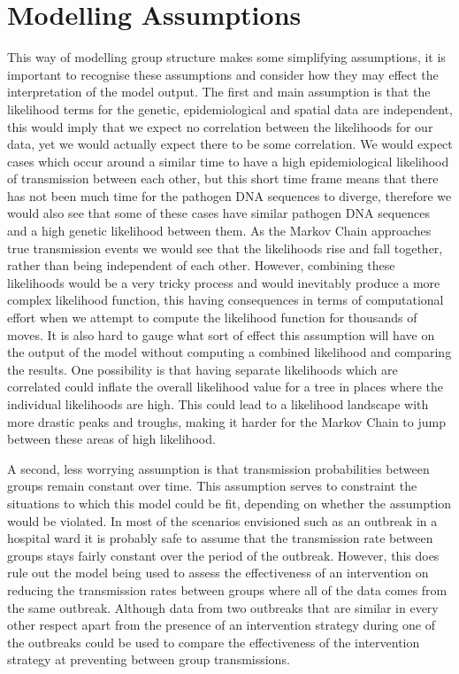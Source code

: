 \documentclass[11pt,a4paper]{report}
\begin{document}
\section{Modelling Assumptions}
This way of modelling group structure makes some simplifying assumptions, it is important to recognise these assumptions and consider how they may effect the interpretation of the model output. The first and main assumption is that the likelihood terms for the genetic, epidemiological and spatial data are independent, this would imply that we expect no correlation between the likelihoods for our data, yet we would actually expect there to be some correlation. We would expect cases which occur around a similar time to have a high epidemiological likelihood of transmission between each other, but this short time frame means that there has not been much time for the pathogen DNA sequences to diverge, therefore we would also see that some of these cases have similar pathogen DNA sequences and a high genetic likelihood between them. As the Markov Chain approaches true transmission events we would see that the likelihoods rise and fall together, rather than being independent of each other. However, combining these likelihoods would be a very tricky process and would inevitably produce a more complex likelihood function, this having consequences in terms of computational effort when we attempt to compute the likelihood function for thousands of moves. It is also hard to gauge what sort of effect this assumption will have on the output of the model without computing a combined likelihood and comparing the results. One possibility is that having separate likelihoods which are correlated could inflate the overall likelihood value for a tree in places where the individual likelihoods are high. This could lead to a likelihood landscape with more drastic peaks and troughs, making it harder for the Markov Chain to jump between these areas of high likelihood.

A second, less worrying assumption is that transmission probabilities between groups remain constant over time. This assumption serves to constraint the situations to which this model could be fit, depending on whether the assumption would be violated. In most of the scenarios envisioned such as an outbreak in a hospital ward it is probably safe to assume that the transmission rate between groups stays fairly constant over the period of the outbreak. However, this does rule out the model being used to assess the effectiveness of an intervention on reducing the transmission rates between groups where all of the data comes from the same outbreak. Although data from two outbreaks that are similar in every other respect apart from the presence of an intervention strategy during one of the outbreaks could be used to compare the effectiveness of the intervention strategy at preventing between group transmissions.
\end{document}
